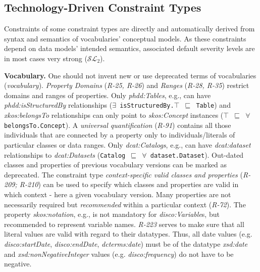 \documentclass{llncs}
\newcommand{\ms}[1]{\texttt{#1}}
\begin{document}
{{%
%
%

\subsection{Technology-Driven Constraint Types}
\label{technology-driven-validation}

Constraints of some constraint types are directly and automatically derived from syntax and semantics of vocabularies' conceptual models.
As these constraints depend on data models' intended semantics, associated default severity levels are in most cases very strong ($\mathcal{SL}_{2}$).

\textbf{Vocabulary.}
One should not invent new or use deprecated terms of vocabularies (\emph{vocabulary}).
\emph{Property Domains} (\emph{R-25, R-26}) and \emph{Ranges} (\emph{R-28, R-35}) restrict domains and ranges of properties.
Only \emph{phdd:Tables}, e.g., can have \emph{phdd:isStructuredBy} relationships (\ms{$\exists$ isStructuredBy.$\top$ $\sqsubseteq$ Table}) and
\emph{xkos:belongsTo} relationships can only point to \emph{skos:Concept} instances (\ms{$\top$ $\sqsubseteq$ $\forall$ belongsTo.Concept}).
A \emph{universal quantification} (\emph{R-91}) contains all those individuals that are connected by a property only to individuals/literals of particular classes  or data ranges.
Only \emph{dcat:Catalogs}, e.g., can have \emph{dcat:dataset} relationships to \emph{dcat:Datasets} (\ms{Catalog $\sqsubseteq$ $\forall$ dataset.Dataset}).
Out-dated classes and properties of previous vocabulary versions can be marked as deprecated.
The constraint type \emph{context-specific valid classes and properties} (\emph{R-209; R-210}) can be used to specify which classes and properties are valid in which context - here a given vocabulary version.
Many properties are not necessarily required but \emph{recommended} within a particular context (\emph{R-72}).
The property {\em skos:notation}, e.g., is not mandatory for {\em disco:Variable}s, but recommended to represent variable names.
\emph{R-223} serves to make sure that all literal values are valid with regard to their datatypes.
Thus, all date values (e.g. {\em disco:startDate}, {\em disco:endDate}, {\em dcterms:date}) must be of the datatype \emph{xsd:date} and \emph{xsd:nonNegativeInteger} values (e.g. \emph{disco:frequency}) do not have to be negative.

}}
\end{document}

